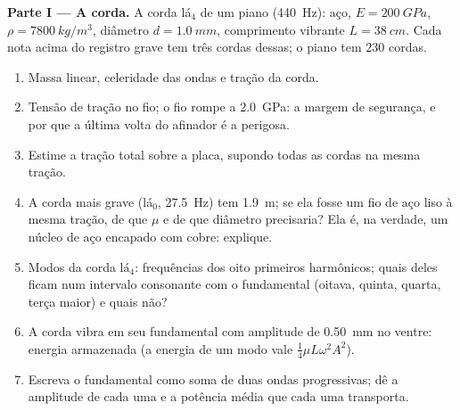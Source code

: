 \begin{problem}
\label{pb:b2:waves-on-strings:1}

\medskip
\noindent\textbf{Parte I --- A corda.}
A corda lá$_4$ de um piano (\qty{440}{Hz}): aço, $E = \qty{200}{GPa}$, $\rho =
\qty{7800}{kg/m^3}$, diâmetro $d = \qty{1.0}{mm}$, comprimento vibrante $L =
\qty{38}{cm}$. Cada nota acima do registro grave tem três cordas dessas; o piano
tem $230$ cordas.
\begin{enumerate}
  \item Massa linear, celeridade das ondas e tração da corda.
  \item Tensão de tração no fio; o fio rompe a \qty{2.0}{GPa}: a
        margem de segurança, e por que a última volta do afinador é a
        perigosa.
  \item Estime a tração total sobre a placa, supondo todas as cordas
        na mesma tração.
  \item A corda mais grave (lá$_0$, \qty{27.5}{Hz}) tem \qty{1.9}{m}; se ela
        fosse um fio de aço liso à mesma tração, de que $\mu$ e de
        que diâmetro precisaria? Ela é, na verdade, um núcleo de aço encapado com
        cobre: explique.
  \item Modos da corda lá$_4$: frequências dos oito primeiros
        harmônicos; quais deles ficam num intervalo consonante com o
        fundamental (oitava, quinta, quarta, terça maior) e quais
        não?
  \item A corda vibra em seu fundamental com amplitude de
        \qty{0.50}{mm} no ventre: energia armazenada (a energia de um
        modo vale $\tfrac14\mu L\omega^2A^2$).
  \item Escreva o fundamental como soma de duas ondas progressivas; dê
        a amplitude de cada uma e a potência média que cada uma transporta.
\end{enumerate}


\end{problem}
